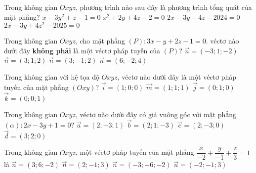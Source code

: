\begin{ex}%
	Trong không gian $O x y z$, phương trình nào sau đây là phương trình tổng quát của mặt phẳng?
	\choice
	{$x-3 y^2+z-1=0$}
	{$x^2+2 y+4 z-2=0$}
	{\True $2 x-3 y+4 z-2024=0$}
	{$2 x-3 y+4 z^2-2025=0$}
\end{ex}

\begin{ex}%
	Trong không gian $O x y z$, cho mặt phẳng $(P)\colon 3 x-y+2 z-1=0$. véctơ nào dưới đây \textbf{không phải} là một véctơ pháp tuyến của $(P)$?
	\choice
	{$\overrightarrow{n}=(-3; 1;-2)$}
	{\True $\overrightarrow{n}=(3; 1; 2)$}
	{$\overrightarrow{n}=(3;-1; 2)$}
	{$\overrightarrow{n}=(6;-2; 4)$}
\end{ex}

\begin{ex}%
	Trong không gian với hệ tọa độ $O x y z$, véctơ nào dưới đây là một véctơ pháp tuyến của mặt phẳng $(O x y)$?
	\choice
	{$\overrightarrow{i}=(1; 0; 0)$}
	{$\overrightarrow{m}=(1; 1; 1)$}
	{$\overrightarrow{j}=(0; 1; 0)$}
	{\True $\overrightarrow{k}=(0; 0; 1)$}
\end{ex}

\begin{ex}%
	Trong không gian $O x y z$, véctơ nào dưới đây có giá vuông góc với mặt phẳng $(\alpha)\colon 2 x-3 y+1=0$?
	\choice
	{$\overrightarrow{a}=(2;-3; 1)$}
	{$\overrightarrow{b}=(2; 1;-3)$}
	{\True $\overrightarrow{c}=(2;-3; 0)$}
	{$\overrightarrow{d}=(3; 2; 0)$}
\end{ex}

\begin{ex}%
	Trong không gian $O x y z$, một véctơ pháp tuyến của mặt phẳng $\dfrac{x}{-2}+\dfrac{y}{-1}+\dfrac{z}{3}=1$ là
	\choice
	{\True $\overrightarrow{n}=(3; 6;-2)$}
	{$\overrightarrow{n}=(2;-1; 3)$}
	{$\overrightarrow{n}=(-3;-6;-2)$}
	{$\overrightarrow{n}=(-2;-1; 3)$}
\end{ex}

